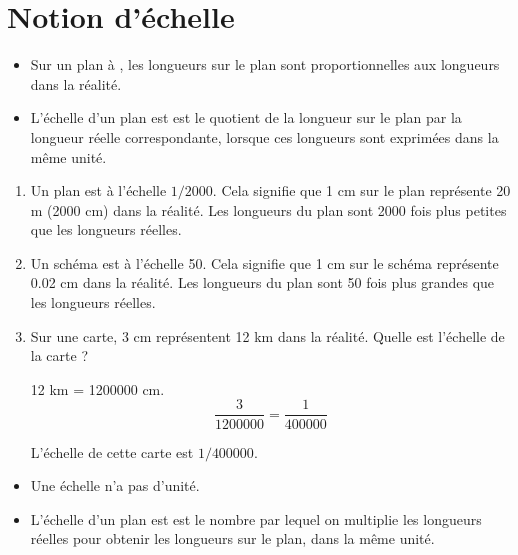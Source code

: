 \documentclass[12pt,a4paper]{article}
\begin{document}
\section{Notion d'échelle}

\begin{mydef}
	\begin{itemize}
		\item 	Sur un plan à , les longueurs sur le plan sont proportionnelles aux longueurs dans la réalité.
		
		\item  L'échelle d'un plan est  est le quotient de la longueur sur le plan par la longueur réelle correspondante, lorsque ces longueurs sont exprimées dans la même unité.
	\end{itemize}

\end{mydef}

\begin{myexs}
	\begin{enumerate}
		\item Un plan est à l'échelle $ 1 / \num{2000}$. Cela signifie que 1 cm sur le plan représente 20 m (\num{2000} cm) dans la réalité. Les longueurs du plan sont 2000 fois plus petites que les longueurs réelles.
		
		
		\item Un schéma est à l'échelle 50. Cela signifie que 1 cm sur le schéma représente \num{0.02} cm dans la réalité. Les longueurs du plan sont 50 fois plus grandes que les longueurs réelles.
		
		
		\item Sur une carte, 3 cm représentent  12 km dans la réalité. Quelle est l'échelle de la carte ?
		
		12 km = \num{1200000} cm.
		\begin{equation*}
		\dfrac{3}{\num{1200000}} = \dfrac{1}{\num{400000}}
		\end{equation*}
		
		L'échelle de cette carte est $1 / \num{400000}$.
	\end{enumerate}
\end{myexs}

\begin{myrems}
	\begin{itemize}
		\item Une échelle n'a pas d'unité.
		\item L'échelle d'un plan est est le nombre par lequel on multiplie les longueurs réelles pour obtenir les longueurs sur le plan, dans la même unité.
	\end{itemize}
\end{myrems}
\end{document}
